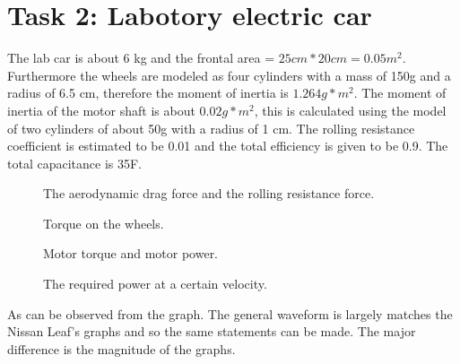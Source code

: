 \documentclass[final]{scrreprt} %
\begin{document}
\section{Task 2: Labotory electric car}

The lab car is about 6 kg and the frontal area = $25cm*20cm = 0.05 m^2$. Furthermore the wheels are modeled as four cylinders with a mass of 150g and a radius of 6.5 cm, therefore the moment of inertia is $1.264g*m^2$. The moment of inertia of the motor shaft is about $0.02g*m^2$, this is calculated using the model of two cylinders of about 50g with a radius of 1 cm. The rolling resistance coefficient is estimated to be 0.01 and the total efficiency is given to be 0.9. The total capacitance is 35F.

\begin{figure}[H]
	\centering
		\newlength\figureheight 
	\newlength\figurewidth 
    	\setlength\figureheight{4cm}
    	\setlength{}
    	
    	\label{fig:aero_and_rolling}
    	\caption{The aerodynamic drag force and the rolling resistance force.}
\end{figure}

\begin{figure}[H]
	\centering
    	\setlength\figureheight{4cm}
    	\setlength{}
    	
    	\label{fig:wheeltorque}
    	\caption{Torque on the wheels.}
\end{figure}

\begin{figure}[H]
	\centering
    	\setlength\figureheight{4cm}
    	\setlength{}
    	
    	\label{fig:motortorque}
    	\caption{Motor torque and motor power.}
\end{figure}

\begin{figure}[H]
	\centering
    	\setlength\figureheight{4cm}
    	\setlength{}
    	
    	\label{fig:reqpower}
    	\caption{The required power at a certain velocity.}
\end{figure}

As can be observed from the graph. The general waveform is largely matches the Nissan Leaf's graphs and so the same statements can be made. The major difference is the magnitude of the graphs.
\end{document}
